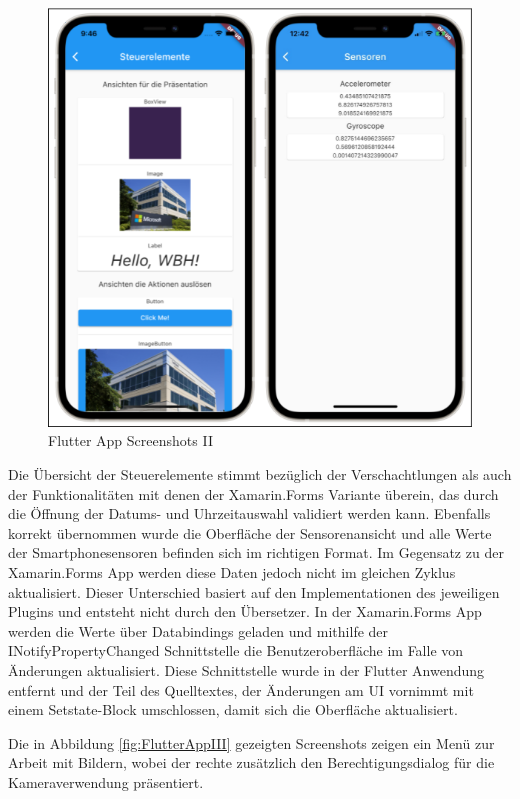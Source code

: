 \begin{figure}[!ht]
 \includegraphics[width=\textwidth,keepaspectratio]{Images/Screenshot/Flutter2ios.png}
 \caption{Flutter App Screenshots II}
 \label{fig:FlutterAppII}
\end{figure}
Die Übersicht der Steuerelemente stimmt  bezüglich der Verschachtlungen als auch der Funktionalitäten mit denen der Xamarin.Forms Variante überein,  das durch die Öffnung der Datums- und Uhrzeitauswahl validiert werden kann.  Ebenfalls korrekt übernommen wurde die Oberfläche der Sensorenansicht und alle Werte der Smartphonesensoren befinden sich im richtigen Format. Im Gegensatz zu der Xamarin.Forms App werden diese Daten jedoch nicht im gleichen Zyklus aktualisiert.  Dieser Unterschied basiert auf den Implementationen des jeweiligen Plugins und entsteht nicht durch den Übersetzer.  In der Xamarin.Forms App werden die Werte über Databindings geladen und mithilfe der INotifyPropertyChanged Schnittstelle die Benutzeroberfläche im Falle von Änderungen aktualisiert.  Diese Schnittstelle wurde in der Flutter Anwendung entfernt und der Teil des Quelltextes,  der Änderungen am UI vornimmt mit einem Setstate-Block umschlossen,  damit sich die Oberfläche aktualisiert.  

Die in Abbildung \ref{fig:FlutterAppIII}   gezeigten Screenshots zeigen ein Menü zur Arbeit mit Bildern, wobei der rechte zusätzlich den Berechtigungsdialog für die Kameraverwendung präsentiert. 
  
